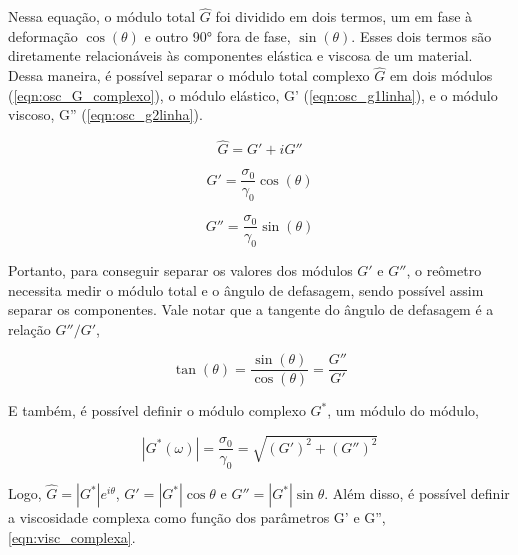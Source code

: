 			Nessa equação, o módulo total \(\hat{G}\) foi dividido em dois termos, um em fase à deformação \(\cos(\theta)\) e outro 90° fora de fase, \(\sin(\theta)\). Esses dois termos são diretamente relacionáveis às componentes elástica e viscosa de um material. Dessa maneira, é possível separar o módulo total complexo \(\hat{G}\) em dois módulos (\autoref{eqn:osc_G_complexo}), o módulo elástico, G' (\autoref{eqn:osc_g1linha}), e o módulo viscoso, G'' (\autoref{eqn:osc_g2linha}).
			
			\begin{equation}
				\hat{G} = G' + iG''
				\label{eqn:osc_G_complexo}
			\end{equation}
			
			\begin{equation} 
				G' = \dfrac{\sigma_0}{\gamma_0} \cos(\theta)
				\label{eqn:osc_g1linha}
			\end{equation} 
			
			\begin{equation} 
				G'' = \dfrac{\sigma_0}{\gamma_0} \sin(\theta)
				\label{eqn:osc_g2linha}
			\end{equation} 
			
			Portanto, para conseguir separar os valores dos módulos \(G'\) e \(G''\), o reômetro necessita medir o módulo total e o ângulo de defasagem, sendo possível assim separar os componentes. Vale notar que a tangente do ângulo de defasagem é a relação \(G''/G'\),
			
			
			\begin{equation}
				\tan(\theta) = \dfrac{\sin(\theta)}{\cos(\theta)} = \dfrac{G''}{G'}
				\label{eqn:osc_tan_teta}
			\end{equation}
	
			E também, é possível definir o módulo complexo \(G^*\), um módulo do módulo,
			
			\begin{equation}
				| G^* (\omega) | = \dfrac{\sigma_0}{\gamma_0} = \sqrt{\left( G' \right)^2 + \left( G'' \right)^2}
				\label{eqn:modulo_complexo}
			\end{equation}
			
			Logo, \(\hat{G} = |G^*| e^{i\theta}\), \(G' = |G^*|\cos \theta\) e \(G'' = |G^*|\sin \theta\). Além disso, é possível definir a viscosidade complexa como função dos parâmetros G' e G'', \autoref{eqn:visc_complexa}.
			
